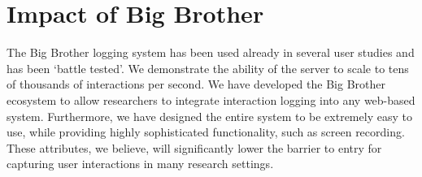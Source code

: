 \vspace{-12pt}
\section{Impact of Big Brother}

The Big Brother logging system has been used already in several user studies and has been `battle tested'. We demonstrate the ability of the \bb server to scale to tens of thousands of interactions per second. We have developed the Big Brother ecosystem to allow researchers to integrate interaction logging into any web-based system. Furthermore, we have designed the entire system to be extremely easy to use, while providing highly sophisticated functionality, such as screen recording. These attributes, we believe, will significantly lower the barrier to entry for capturing user interactions in many research settings.